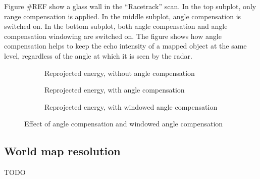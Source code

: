 Figure \#REF show a glass wall in the ``Racetrack'' scan. In the top
subplot, only range compensation is applied. In the middle subplot,
angle compensation is switched on. In the bottom subplot, both angle
compensation and angle compensation windowing are switched on. The
figure shows how angle compensation helps to keep the echo intensity of
a mapped object at the same level, regardless of the angle at which it
is seen by the radar.

\begin{figure}[htbp]
    \centering
    \label{fig:fig_angle_compensation_comparison}
    \begin{subfigure}{\textwidth}
        \centering
        \def\svgscale{0.8} \small
        
        \caption{Reprojected energy, without angle compensation}
        \bigskip
    \end{subfigure}
    \begin{subfigure}{\textwidth}
        \centering
        \def\svgscale{0.8} \small
        
        \caption{Reprojected energy, with angle compensation}
        \bigskip
    \end{subfigure}
    \begin{subfigure}{\textwidth}
        \centering
        \def\svgscale{0.8} \small
        
        \caption{Reprojected energy, with windowed angle compensation}
        \bigskip
    \end{subfigure}
    \caption{Effect of angle compensation and windowed angle compensation}
\end{figure}


\subsection{World map resolution}\label{world-map-resolution}
TODO
